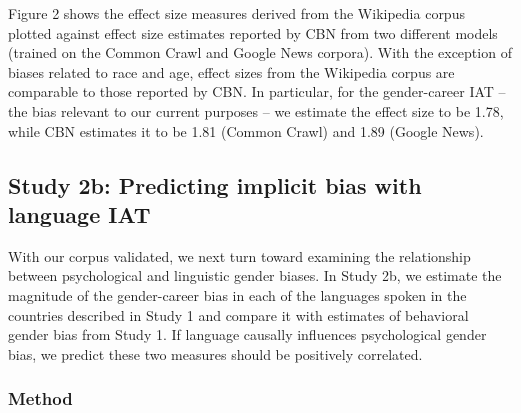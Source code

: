 \documentclass[10pt, letterpaper]{article}
\begin{document}
Figure 2 shows the effect size measures derived from the Wikipedia
corpus plotted against effect size estimates reported by CBN from two
different models (trained on the Common Crawl and Google News corpora).
With the exception of biases related to race and age, effect sizes from
the Wikipedia corpus are comparable to those reported by CBN. In
particular, for the gender-career IAT -- the bias relevant to our
current purposes -- we estimate the effect size to be 1.78, while CBN
estimates it to be 1.81 (Common Crawl) and 1.89 (Google News).

\subsection{Study 2b: Predicting implicit bias with language
IAT}\label{study-2b-predicting-implicit-bias-with-language-iat}

With our corpus validated, we next turn toward examining the
relationship between psychological and linguistic gender biases. In
Study 2b, we estimate the magnitude of the gender-career bias in each of
the languages spoken in the countries described in Study 1 and compare
it with estimates of behavioral gender bias from Study 1. If language
causally influences psychological gender bias, we predict these two
measures should be positively correlated.

\subsubsection{Method}\label{method-2}
\end{document}
